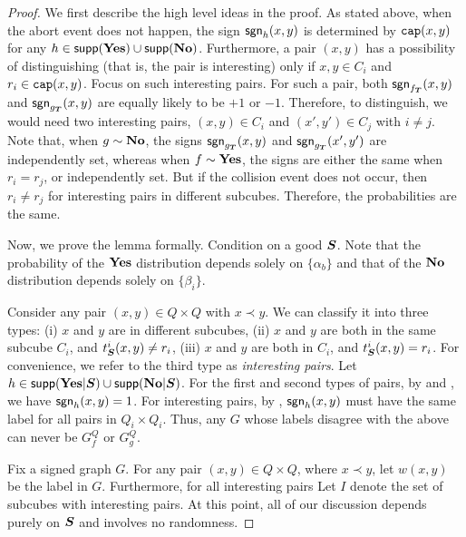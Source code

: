 \begin{proof}
We first describe the high level ideas in the proof. As stated above, when the abort event does not happen, the sign $\mathsf{sgn}_h(x,y)$ is determined by $\mathtt{cap}(x,y)$ for any $h\in \mathsf{supp}(\mathbf{Yes})\cup \mathsf{supp}(\mathbf {No})$.
Furthermore,  a pair $(x,y)$ has a possibility of distinguishing (that is, the pair is interesting) only if $x,y \in C_i$ and $r_i \in \mathtt{cap}(x,y)$.
Focus on such interesting pairs. For such a pair, both $\mathsf{sgn}_{f_{\boldsymbol{T}}}(x,y)$ and $\mathsf{sgn}_{g_{\boldsymbol{T}}}(x,y)$ are equally likely to be $+1$ or $-1$.
Therefore, to distinguish, we would need two interesting pairs, $(x,y) \in C_i$ and $(x',y') \in C_j$ with $i \neq j$. Note that, when $g \sim \mathbf {No}$,
the signs $\mathsf{sgn}_{g_{\boldsymbol{T}}}(x,y)$ and $\mathsf{sgn}_{g_{\boldsymbol{T}}}(x',y')$ are independently set, whereas when $f \sim \mathbf{Yes}$, the signs are either the same when $r_i = r_j$, or independently set.
But if the collision event does not occur, then $r_i \neq r_j$ for interesting pairs in different subcubes. Therefore, the probabilities are the same.

Now, we prove the lemma formally.
	Condition on a good $\boldsymbol{S}$. Note that
	the probability of the $\mathbf{Yes}$ distribution depends
	solely on $\{\alpha_b\}$ and that of the $\mathbf {No}$ distribution
	depends solely on $\{\beta_i\}$.
	
	Consider any pair $(x,y) \in Q\times Q$ with $x \prec y$.
	We can classify it into three types: (i) $x$ and $y$ are in different
	subcubes, (ii) $x$ and $y$ are both in the same subcube $C_i$, and $t^{i}_{\boldsymbol{S}}(x,y) \neq r_i$,
	(iii) $x$ and $y$ are both in $C_i$, and $t^{i}_{\boldsymbol{S}}(x,y) = r_i$.
	For convenience, we refer to the third type as {\em interesting pairs}.
	Let $h \in \mathsf{supp}(\mathbf{Yes} | \boldsymbol{S}) \cup \mathsf{supp}(\mathbf {No} | \boldsymbol{S})$.
	For the first and second types of pairs, by  and , we have $\mathsf{sgn}_h(x,y) = 1$.
	For interesting pairs, by , $\mathsf{sgn}_h(x,y)$
	must have the same label for all pairs in $Q_i \times Q_i$.
	Thus, any $G$ whose labels disagree with the above can never
	be $G^Q_f$ or $G^Q_g$.
	
	Fix a signed graph $G$. For any pair $(x,y) \in Q \times Q$, where $x \prec y$,
	let $w(x,y)$ be the label in $G$. Furthermore, for all interesting pairs
	Let $I$ denote the set of subcubes with interesting pairs.
	At this point, all of our discussion depends purely on $\boldsymbol{S}$
	and involves no randomness.
	

\end{proof}
